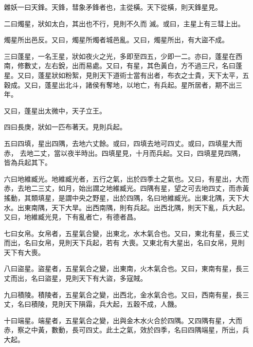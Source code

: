 \begin{pinyinscope}
 雜妖一曰天鋒。天鋒，彗象矛鋒者也，主從橫。天下從橫，則天鋒星見。



 二曰燭星，狀如太白，其出也不行，見則不久而
 滅。或曰，主星上有三彗上出。



 燭星所出邑反。又曰，燭星所燭者城邑亂。又曰，燭星所出，有大盜不成。



 三曰蓬星，一名王星，狀如夜火之光，多即至四五，少即一二。亦曰，蓬星在西南，修數丈，左右銳，出而易處。又曰，有星，其色黃白，方不過三尺，名曰蓬星。又曰，蓬星狀如粉絮，見則天下道術士當有出者，布衣之士貴，天下太平，五穀成。又曰，蓬星出北斗，諸侯有奪地，以地亡，有兵起。星所居者，期不出三年。



 又曰，蓬星出太微中，天子立王。



 四曰長庚，狀如一匹布著天。見則兵起。



 五曰四填，星出四隅，去地六丈餘。或曰，四填去地可四丈。或曰，四填星大而赤，
 去地二丈，當以夜半時出。四填星見，十月而兵起。又曰，四填星見四隅，皆為兵起其下。



 六曰地維臧光。地維臧光者，五行之氣，出於四季土之氣也。又曰，有星出，大而赤，去地二三丈，如月，始出謂之地維臧光。四隅有星，望之可去地四丈，而赤黃搖動，其類填星，是謂中央之野星，出於四隅，名曰地維臧光。出東北隅，天下大水。出東南隅，天下大旱。出西南隅，則有兵起。出西北隅，則天下亂，兵大起。又曰，地維臧光見，下有亂者亡，有德者昌。



 七曰女帛。女帛者，五星氣合變，出東北，水木氣合也。又曰，東北有星，長三丈而出，名曰女帛，見則天下兵起，若有
 大喪。又東北有大星出，名曰女帛，見則天下有大喪。



 八曰盜星。盜星者，五星氣合之變，出東南，火木氣合也。又曰，東南有星，長三丈而出，名曰盜星，見則天下有大盜，多寇賊。



 九曰積陵。積陵者，五星氣合之變，出西北，金水氣合也。又曰，西南有星，長三丈，名曰積陵，見則天下隕霜，兵大起，五穀不成，人饑。



 十曰端星。端星者，五星氣合之變，出與金木水火合於四隅。又四隅有星，大而赤，察之中黃，數動，長可四丈。此土之氣，效於四季，名曰四隅端星，所出，兵大起。




\end{pinyinscope}
